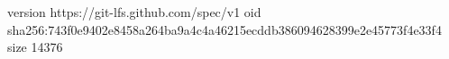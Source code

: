 version https://git-lfs.github.com/spec/v1
oid sha256:743f0e9402e8458a264ba9a4c4a46215ecddb386094628399e2e45773f4e33f4
size 14376
